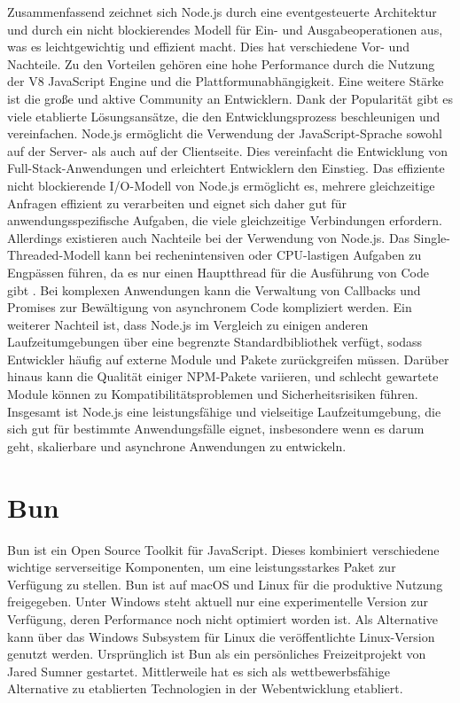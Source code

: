 \noindent
Zusammenfassend zeichnet sich Node.js durch eine eventgesteuerte Architektur und durch ein nicht blockierendes Modell für Ein- und Ausgabeoperationen aus, was es leichtgewichtig und effizient macht. Dies hat verschiedene Vor- und Nachteile. \newline
Zu den Vorteilen gehören eine hohe Performance durch die Nutzung der V8 JavaScript Engine und die Plattformunabhängigkeit. Eine weitere Stärke ist die große und aktive Community an Entwicklern. Dank der Popularität gibt es viele etablierte Lösungsansätze, die den Entwicklungsprozess beschleunigen und vereinfachen. \cite{OpenJSFoundation.2022} Node.js ermöglicht die Verwendung der JavaScript-Sprache sowohl auf der Server- als auch auf der Clientseite. Dies vereinfacht die Entwicklung von Full-Stack-Anwendungen und erleichtert Entwicklern den Einstieg. \cite{Brown.November2019} Das effiziente nicht blockierende I/O-Modell von Node.js ermöglicht es, mehrere gleichzeitige Anfragen effizient zu verarbeiten und eignet sich daher gut für anwendungsspezifische Aufgaben, die viele gleichzeitige Verbindungen erfordern.   \newline
Allerdings existieren auch Nachteile bei der Verwendung von Node.js. Das Single-Threaded-Modell kann bei rechenintensiven oder CPU-lastigen Aufgaben zu Engpässen führen, da es nur einen Hauptthread für die Ausführung von Code gibt  \cite{Chhetri.2016}. Bei komplexen Anwendungen kann die Verwaltung von Callbacks und Promises zur Bewältigung von asynchronem Code kompliziert werden.  \newline
Ein weiterer Nachteil ist, dass Node.js im Vergleich zu einigen anderen Laufzeitumgebungen über eine begrenzte Standardbibliothek verfügt, sodass Entwickler häufig auf externe Module und Pakete zurückgreifen müssen. Darüber hinaus kann die Qualität einiger NPM-Pakete variieren, und schlecht gewartete Module können zu Kompatibilitätsproblemen und Sicherheitsrisiken führen.  \newline
Insgesamt ist Node.js eine leistungsfähige und vielseitige Laufzeitumgebung, die sich gut für bestimmte Anwendungsfälle eignet, insbesondere wenn es darum geht, skalierbare und asynchrone Anwendungen zu entwickeln. 

\section{Bun} \label{sec:foundations-Bun}
Bun ist ein Open Source Toolkit für JavaScript. Dieses kombiniert verschiedene wichtige serverseitige Komponenten, um eine leistungsstarkes Paket zur Verfügung zu stellen. Bun ist auf macOS und Linux für die produktive Nutzung freigegeben. Unter Windows steht aktuell nur eine experimentelle Version zur Verfügung, deren Performance noch nicht optimiert worden ist. Als Alternative kann über das Windows Subsystem für Linux die veröffentlichte Linux-Version genutzt werden. \cite{Sumner.2023} Ursprünglich ist Bun als ein persönliches Freizeitprojekt von Jared Sumner gestartet. Mittlerweile hat es sich als wettbewerbsfähige Alternative zu etablierten Technologien in der Webentwicklung etabliert. \cite{Tyson.2023}\\

